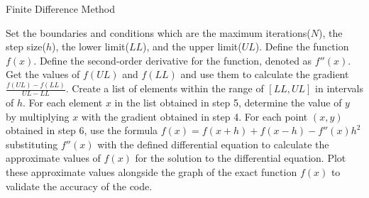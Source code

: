 \begin{algorithm}
  \caption{Finite Difference Method}
  \begin{algorithmic}[1]
  \State Set the boundaries and conditions which are the maximum iterations($N$), the step size($h$), the lower limit($LL$), and the upper limit($UL$).
  \State Define the function $f(x)$.
  \State Define the second-order derivative for the function, denoted as $f''(x)$.
  \State Get the values of $f(UL)$ and $f(LL)$ and use them to calculate the gradient $\frac{f(UL)-f(LL)}{UL-LL}$.
  \State Create a list of elements within the range of $[LL, UL]$ in intervals of $h$.
  \State For each element $x$ in the list obtained in step 5, determine the value of $y$ by multiplying $x$ with the gradient obtained in step 4.
  \State For each point $(x,y)$ obtained in step 6, use the formula $f(x)=f(x+h)+f(x-h)-f''(x)h^2$ substituting $f''(x)$ with the defined differential equation to calculate the approximate values of $f(x)$ for the solution to the differential equation.
  \State Plot these approximate values alongside the graph of the exact function $f(x)$ to validate the accuracy of the code.
  \end{algorithmic}
  \end{algorithm}

